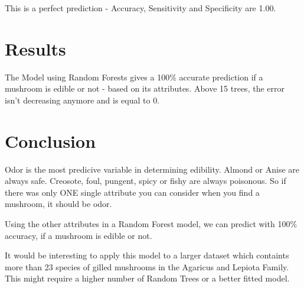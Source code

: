 \documentclass[]{article}
\begin{document}
This is a perfect prediction - Accuracy, Sensitivity and Specificity are
1.00.

\section{Results}\label{results}

The Model using Random Forests gives a 100\% accurate prediction if a
mushroom is edible or not - based on its attributes. Above 15 trees, the
error isn't decreasing anymore and is equal to 0.

\section{Conclusion}\label{conclusion}

Odor is the most predicive variable in determining edibility. Almond or
Anise are always safe. Creosote, foul, pungent, spicy or fishy are
always poisonous. So if there was only ONE single attribute you can
consider when you find a mushroom, it should be odor.

Using the other attributes in a Random Forest model, we can predict with
100\% accuracy, if a mushroom is edible or not.

It would be interesting to apply this model to a larger dataset which
containts more than 23 species of gilled mushrooms in the Agaricus and
Lepiota Family. This might require a higher number of Random Trees or a
better fitted model.
\end{document}
